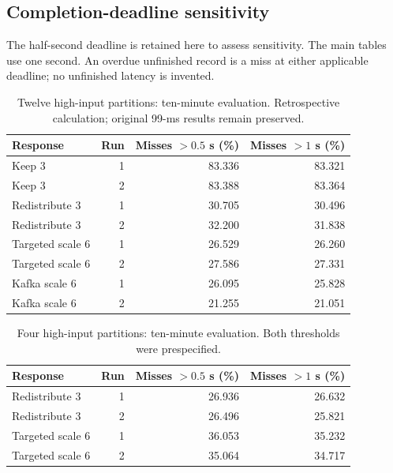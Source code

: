 \subsection{Completion-deadline sensitivity}\label{app:deadline-sensitivity}
The half-second deadline is retained here to assess sensitivity. The main tables use one second. An overdue unfinished record is a miss at either applicable deadline; no unfinished latency is invented.
\begin{table}[!htbp]
\centering\small
\setlength{\tabcolsep}{3pt}
\renewcommand{\arraystretch}{1.12}
\begin{tabular}{@{}lrrr@{}}
\toprule
Response & Run & Misses $>0.5$ s (\%) & Misses $>1$ s (\%)\\
\midrule
Keep 3 & 1 & 83.336 & 83.321\\
Keep 3 & 2 & 83.388 & 83.364\\
Redistribute 3 & 1 & 30.705 & 30.496\\
Redistribute 3 & 2 & 32.200 & 31.838\\
Targeted scale 6 & 1 & 26.529 & 26.260\\
Targeted scale 6 & 2 & 27.586 & 27.331\\
Kafka scale 6 & 1 & 26.095 & 25.828\\
Kafka scale 6 & 2 & 21.255 & 21.051\\
\bottomrule
\end{tabular}
\caption{Twelve high-input partitions: ten-minute evaluation. Retrospective calculation; original 99-ms results remain preserved.}
\label{tab:twelve-partition-deadline-sensitivity}
\end{table}
\begin{table}[!htbp]
\centering\small
\setlength{\tabcolsep}{3pt}
\renewcommand{\arraystretch}{1.12}
\begin{tabular}{@{}lrrr@{}}
\toprule
Response & Run & Misses $>0.5$ s (\%) & Misses $>1$ s (\%)\\
\midrule
Redistribute 3 & 1 & 26.936 & 26.632\\
Redistribute 3 & 2 & 26.496 & 25.821\\
Targeted scale 6 & 1 & 36.053 & 35.232\\
Targeted scale 6 & 2 & 35.064 & 34.717\\
\bottomrule
\end{tabular}
\caption{Four high-input partitions: ten-minute evaluation. Both thresholds were prespecified.}
\label{tab:four-partition-deadline-sensitivity}
\end{table}
